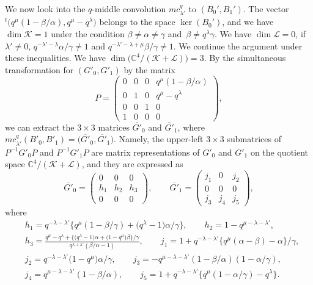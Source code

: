 \documentclass[pdftex]{sigma}
\numberwithin{equation}{section}
\theoremstyle{definition}
\begin{document}
We now look into the $q$-middle convolution $mc^q_{\lambda'}$ to $(B_0', B_1')$.
The vector ${}^t\bigl(q^{\mu}(1-\beta / \alpha ), \allowbreak q^{\mu}-q^{\lambda}\bigr)$ belongs to the space $\ker (B_0 ')$, and we have $\dim \mathcal{K}=1$ under the condition $ \beta \neq \alpha \neq \gamma $ and~${\beta \neq q^{\lambda} \gamma }$.
We have $\dim \mathcal{L}=0$, if $\lambda ' \neq 0$, $q^{-\lambda'-\lambda} \alpha/\gamma \neq 1$ and $q^{-\lambda'-\lambda +\mu } \beta /\gamma \neq 1 $.
We continue the argument under these inequalities.
We have $\dim \bigl(\mathbb{C}^4/(\mathcal{K} + \mathcal{L}) \bigr) =3 $.
By the simultaneous transformation for $(G'_0, G'_1)$ by the matrix
\begin{equation*}
P = \begin{pmatrix}
 0 & 0 & 0 & q^{\mu}(1-\beta /\alpha ) \\
 0 & 1 & 0 & q^{\mu}-q^{\lambda} \\
 0 & 0 & 1 & 0 \\
 1 & 0 & 0 & 0
\end{pmatrix},
\end{equation*}
we can extract the $3 \times 3$ matrices $\overline{G'}_0$ and $\overline{G'}_1$, where $mc^q_{\lambda'}(B'_0, B'_1) = \bigl(\overline{G'}_0, \overline{G'}_1\bigr)$.
Namely, the upper-left $3\times 3$ submatrices of $P^{-1}G'_0 P$ and $P^{-1}G'_1 P$ are matrix representations of $G'_0$ and $G'_1$ on the quotient space $\mathbb{C}^4/(\mathcal{K} + \mathcal{L}) $, and they are expressed as
\begin{equation*}
\overline{G'}_0
= \begin{pmatrix}
 0 & 0 & 0 \\
 h_1 & h_2 & h_3 \\
 0 & 0 & 0
 \end{pmatrix}, \qquad
\overline{G'}_1
= \begin{pmatrix}
 j_1 & 0 & j_2 \\
 0 & 0 & 0 \\
 j_3 & j_4 & j_5
 \end{pmatrix},
\end{equation*}
where
\begin{align*}
& h_1 = q^{-\lambda-\lambda'} \bigl\{ q^{\mu} (1- \beta /\gamma ) + \bigl(q^{\lambda} -1\bigr) \alpha /\gamma \bigr\} , \qquad h_2 = 1-q^{\mu-\lambda-\lambda'}, \\
& h_3 = \frac{q^{\mu}-q^{\lambda}+\bigl\{ \bigl(q^{\lambda}-1\bigr)\alpha +\bigl(1-q^{\mu}\bigr)\beta \bigr\} /\gamma }{q^{\lambda+\lambda'}(\beta /\alpha -1)}, \qquad j_1 = 1 + q^{-\lambda-\lambda'} \{q^{\mu}( \alpha -\beta) - \alpha \} /\gamma , \\
& j_2 = q^{-\lambda-\lambda'}\bigl(1-q^{\mu}\bigr)\alpha /\gamma ,\qquad j_3 = -q^{\mu-\lambda-\lambda'} (1- \beta /\alpha )(1-\alpha / \gamma ), \\
& j_4 = q^{\mu-\lambda-\lambda'}(1- \beta /\alpha ), \qquad j_5 = 1 + q^{-\lambda-\lambda'}\bigl\{ q^{\mu}(1-\alpha/ \gamma )-q^{\lambda} \bigr\}.
\end{align*}
\end{document}
